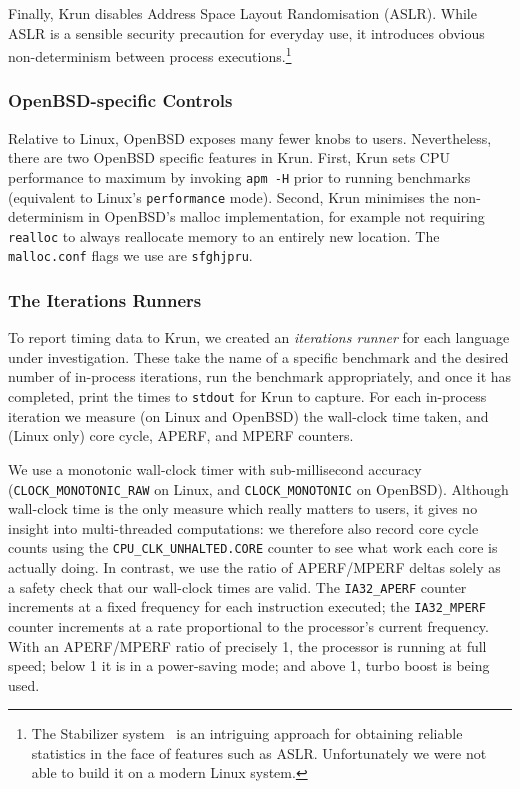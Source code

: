 \documentclass[preprint,numbers,10pt]{sigplanconf}
\newcommand{\krun}{Krun\xspace}
\begin{document}
Finally, \krun disables Address Space Layout Randomisation (ASLR). While ASLR is
a sensible security precaution for everyday use, it introduces obvious
non-determinism between process executions.\footnote{The Stabilizer
system~\cite{curtsinger13stabilizer} is an intriguing approach for obtaining reliable
statistics in the face of features such as ASLR. Unfortunately we were not able
to build it on a modern Linux system.}


\subsubsection{OpenBSD-specific Controls}

Relative to Linux, OpenBSD exposes many fewer knobs to users. Nevertheless,
there are two OpenBSD specific features in \krun.
First, \krun sets CPU performance to maximum by invoking \texttt{apm -H} prior
to running benchmarks (equivalent to Linux's \texttt{performance} mode).
Second, \krun minimises the non-determinism in OpenBSD's malloc implementation,
for example not requiring \texttt{realloc} to always reallocate memory to
an entirely new location. The \texttt{malloc.conf} flags we use are \texttt{sfghjpru}.


\subsubsection{The Iterations Runners}

To report timing data to \krun, we created an
\emph{iterations runner} for each language under investigation.
These take the name of a specific benchmark and
the desired number of in-process iterations, run the benchmark appropriately,
and once it has completed, print the times to \texttt{stdout} for \krun to
capture. For each in-process iteration we
measure (on Linux and OpenBSD) the wall-clock time taken, and (Linux only) core
cycle, APERF, and MPERF counters.

We use a monotonic wall-clock timer with sub-millisec\-ond accuracy
(\texttt{CLOCK\_MONOTONIC\_RAW} on Linux, and \texttt{CLOCK\-\_MONOTONIC} on
OpenBSD). Although wall-clock time is the only measure which really matters to
users, it gives no insight into multi-threaded computations: we therefore also record
core cycle counts using the \texttt{CPU\-\_CLK\-\_UNHALTED\-.CORE} counter to see
what work each core is actually doing. In contrast, we use the ratio of APERF/MPERF deltas
solely as a safety check that our wall-clock times are valid.
The \texttt{IA32\_APERF} counter increments at a fixed
frequency for each instruction executed; the \texttt{IA32\_MPERF} counter increments at a rate
proportional to the processor's current frequency. With an APERF/MPERF ratio of
precisely 1, the processor is running at full speed; below 1 it is in
a power-saving mode; and above 1, turbo boost is being used.
\end{document}
